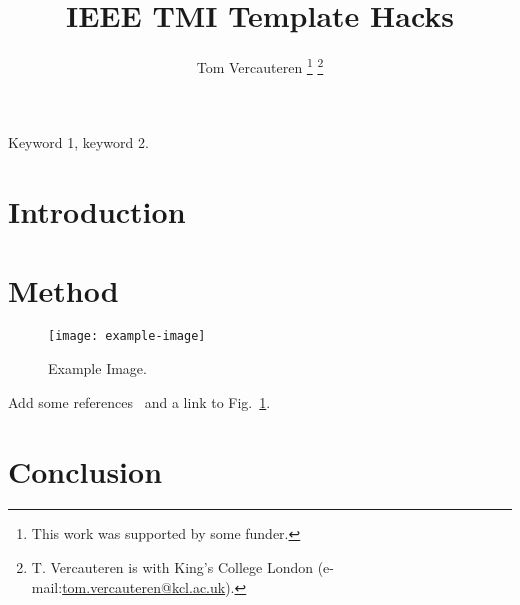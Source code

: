 \documentclass[journal,twoside,web]{ieeecolor}
\newcommand{\figref}[1]{Fig.~\ref{#1}}
\begin{document}

\title{IEEE TMI Template Hacks}
\author{Tom Vercauteren
\thanks{This work was supported by some funder.}%
\thanks{T. Vercauteren is with King's College London (e-mail:\href{mailto:tom.vercauteren@kcl.ac.uk}{tom.vercauteren@kcl.ac.uk}). }%
}


\maketitle

\begin{abstract}
\blindtext
\end{abstract}

\begin{IEEEkeywords}
Keyword 1, keyword 2.
\end{IEEEkeywords}

\section{Introduction}
\blindtext[2]

\section{Method}
\blindmathpaper

\begin{figure}[tbh!]
\centering
\texttt{[image: example-image]}
\caption{Example Image.\label{fig:example}}
\end{figure}

\blindtext
Add some references~\cite{article-full,inproceedings-full,phdthesis-full,Bakas:arXiv:2018} and a link to \figref{fig:example}.

\section{Conclusion}
\blindtext[3]



 
\end{document}
